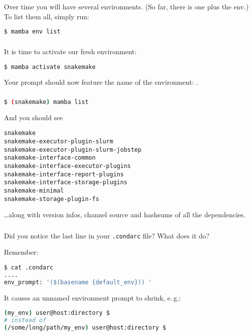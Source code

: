\begin{frame}[fragile]
	\frametitle{}
	Over time you will have several environments. (So far, there is one plus the  env.) To list them all, simply run:
	\begin{lstlisting}[language=Bash, style=Shell]
$ mamba env list
	\end{lstlisting}
\end{frame}

\begin{frame}[fragile]
	\frametitle{}
	It is time to activate our fresh environment:
	\begin{lstlisting}[language=Bash, style=Shell]
$ mamba activate snakemake
	\end{lstlisting}
    Your prompt should now feature the name of the environment: .
\end{frame}

\begin{frame}[fragile]
    \frametitle{}
    \begin{lstlisting}[language=Bash, style=Shell]
$ (snakemake) mamba list
    \end{lstlisting}
     And you should see
     \begin{lstlisting}[style=Plain]
snakemake
snakemake-executor-plugin-slurm
snakemake-executor-plugin-slurm-jobstep
snakemake-interface-common
snakemake-interface-executor-plugins
snakemake-interface-report-plugins
snakemake-interface-storage-plugins
snakemake-minimal
snakemake-storage-plugin-fs
     \end{lstlisting}
     \ldots along with version infos, channel source and hashsums of all the dependencies.
\end{frame}

\begin{frame}[fragile]
   \frametitle{}
   \begin{question}
   	Did you notice the last line in your \texttt{.condarc} file? What does it do?
   \end{question} 
   Remember:
     \begin{lstlisting}[language=Bash, style=Shell]
$ cat .condarc
....
env_prompt: '($(basename {default_env})) '
   \end{lstlisting}
   \pause
   It causes an unnamed environment prompt to shrink, e.\,g.:
   \begin{lstlisting}[language=Bash, style=Plain]
(my_env) user@host:directory $
# instead of
(/some/long/path/my_env) user@host:directory $
   \end{lstlisting}
\end{frame}



